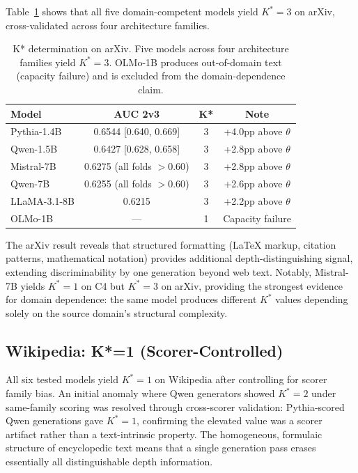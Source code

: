 \documentclass[11pt,a4paper]{article}
\begin{document}
Table~\ref{tab:arxiv_kstar} shows that all five domain-competent models yield $K^*{=}3$ on arXiv, cross-validated across four architecture families.

\begin{table}[t]
\centering
\caption{K* determination on arXiv. Five models across four architecture families yield $K^*{=}3$. OLMo-1B produces out-of-domain text (capacity failure) and is excluded from the domain-dependence claim.}
\label{tab:arxiv_kstar}
\small
\begin{tabular}{lccc}
\toprule
\textbf{Model} & \textbf{AUC 2v3} & \textbf{K*} & \textbf{Note} \\
\midrule
Pythia-1.4B & 0.6544 [0.640, 0.669] & 3 & +4.0pp above $\theta$ \\
Qwen-1.5B & 0.6427 [0.628, 0.658] & 3 & +2.8pp above $\theta$ \\
Mistral-7B & 0.6275 (all folds $> 0.60$) & 3 & +2.8pp above $\theta$ \\
Qwen-7B & 0.6255 (all folds $> 0.60$) & 3 & +2.6pp above $\theta$ \\
LLaMA-3.1-8B & 0.6215 & 3 & +2.2pp above $\theta$ \\
\midrule
OLMo-1B & --- & 1 & Capacity failure \\
\bottomrule
\end{tabular}
\end{table}

The arXiv result reveals that structured formatting (LaTeX markup, citation patterns, mathematical notation) provides additional depth-distinguishing signal, extending discriminability by one generation beyond web text. Notably, Mistral-7B yields $K^*{=}1$ on C4 but $K^*{=}3$ on arXiv, providing the strongest evidence for domain dependence: the same model produces different $K^*$ values depending solely on the source domain's structural complexity.

\subsection{Wikipedia: K*=1 (Scorer-Controlled)}

All six tested models yield $K^*{=}1$ on Wikipedia after controlling for scorer family bias. An initial anomaly where Qwen generators showed $K^*{=}2$ under same-family scoring was resolved through cross-scorer validation: Pythia-scored Qwen generations gave $K^*{=}1$, confirming the elevated value was a scorer artifact rather than a text-intrinsic property. The homogeneous, formulaic structure of encyclopedic text means that a single generation pass erases essentially all distinguishable depth information.
\end{document}

